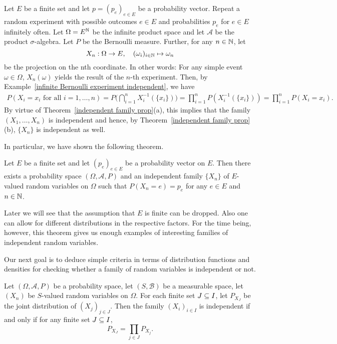 \begin{example}
Let $E$ be a finite set and let $p=(p_e)_{e\in E}$ be a probability vector. Repeat a random experiment with possible outcomes $e\in E$ and probabilities $p_e$ for $e\in E$ infinitely often. Let $\Omega=E^{\mathbb{N}}$ be the infinite product space and let $\mathcal{A}$ be the product $\sigma$-algebra. Let $P$ be the Bernoulli measure. Further, for any $n\in\mathbb{N}$, let
\[X_n:\Omega\to E,\quad (\omega_i)_{i\in\mathbb{N}}\mapsto \omega_n\]
be the projection on the nth coordinate. In other words: For any simple event $\omega\in\Omega$, $X_n(\omega)$ yields the result of the $n$-th experiment. Then, by Example~\ref{infinite Bernoulli experiment independent}, we have
\begin{align*}
P(X_i=x_i\text{ for all $i=1,\dots,n$})=P\Big(\bigcap_{i=1}^{n}X_i^{-1}(\{x_i\})\Big)=\prod_{i=1}^{n}P(X_i^{-1}(\{x_i\}))=\prod_{i=1}^{n}P(X_i=x_i).
\end{align*}
By virtue of Theorem~\ref{independent family prop}(a), this implies that the family $(X_1,\dots,X_n)$ is independent and hence, by Theorem~\ref{independent family prop}(b), $\{X_n\}$ is independent as well.
\end{example}
In particular, we have shown the following theorem.
\begin{theorem}
Let $E$ be a finite set and let $(p_e)_{e\in E}$ be a probability vector on $E$. Then there exists a probability space $(\Omega,\mathcal{A},P)$ and an independent family $\{X_n\}$ of $E$-valued random variables on $\Omega$ such that $P(X_n=e)=p_e$ for any $e\in E$ and $n\in\mathbb{N}$.
\end{theorem}
Later we will see that the assumption that $E$ is finite can be dropped. Also one can allow for different distributions in the respective factors. For the time being, however, this theorem gives us enough examples of interesting families of independent random variables.\par
Our next goal is to deduce simple criteria in terms of distribution functions and densities for checking whether a family of random variables is independent or not.
\begin{theorem}\label{independent radom variable iff joint}
Let $(\Omega,\mathcal{A},P)$ be a probability space, let $(S,\mathcal{B})$ be a measurable space, let $(X_n)$ be $S$-valued random variables on $\Omega$. For each finite set $J\subseteq I$, let $P_{X_J}$ be the joint distribution of $(X_j)_{j\in J}$. Then the family $(X_i)_{i\in I}$ is independent if and only if for any finite set $J\subseteq I$,
\[P_{X_J}=\prod_{j\in J}P_{X_j}.\]
\end{theorem}
